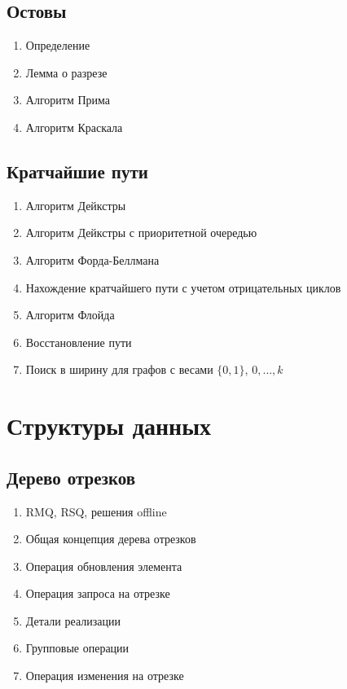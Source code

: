 \documentclass[a4paper,12pt]{article}
\begin{document}
    \subsection{Остовы}
      \begin{enumerate}
        \item Определение
        \item Лемма о разрезе
        \item Алгоритм Прима
        \item Алгоритм Краскала
      \end{enumerate}

    \subsection{Кратчайшие пути}
      \begin{enumerate}
        \item Алгоритм Дейкстры
        \item Алгоритм Дейкстры с приоритетной очередью
        \item Алгоритм Форда-Беллмана
        \item Нахождение кратчайшего пути с учетом отрицательных циклов
        \item Алгоритм Флойда
        \item Восстановление пути
        \item Поиск в ширину для графов с весами $\{0, 1\}$, ${0, \ldots, k}$
      \end{enumerate}

  \section{Структуры данных}

    \subsection{Дерево отрезков}
      \begin{enumerate}
        \item RMQ, RSQ, решения offline
        \item Общая концепция дерева отрезков
        \item Операция обновления элемента
        \item Операция запроса на отрезке
        \item Детали реализации
        \item Групповые операции
        \item Операция изменения на отрезке
      \end{enumerate}
\end{document}
